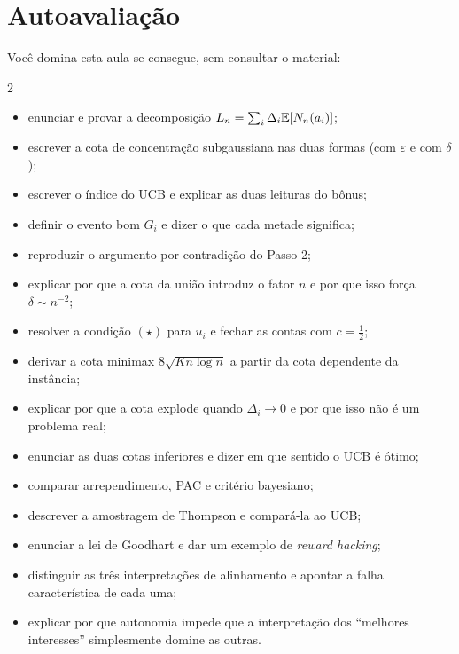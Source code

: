 \documentclass[11pt]{article}
\begin{document}
\section{Autoavaliação}

Você domina esta aula se consegue, sem consultar o material:

\begin{multicols}{2}
{\small
\begin{itemize}[leftmargin=1.5em, itemsep=0.3ex, topsep=0.2ex, label=$\square$]
  \item enunciar e provar a decomposição $L_n = \sum_i\Delta_i\mathbb{E}[N_n(a_i)]$;
  \item escrever a cota de concentração subgaussiana nas duas formas
        (com $\varepsilon$ e com $\delta$);
  \item escrever o índice do UCB e explicar as duas leituras do bônus;
  \item definir o evento bom $G_i$ e dizer o que cada metade significa;
  \item reproduzir o argumento por contradição do Passo 2;
  \item explicar por que a cota da união introduz o fator $n$ e por que isso
        força $\delta \sim n^{-2}$;
  \item resolver a condição $(\star)$ para $u_i$ e fechar as contas com
        $c = \tfrac12$;
  \item derivar a cota minimax $8\sqrt{Kn\log n}$ a partir da cota dependente
        da instância;
  \item explicar por que a cota explode quando $\Delta_i\to 0$ e por que isso
        não é um problema real;
  \item enunciar as duas cotas inferiores e dizer em que sentido o UCB é ótimo;
  \item comparar arrependimento, PAC e critério bayesiano;
  \item descrever a amostragem de Thompson e compará-la ao UCB;
  \item enunciar a lei de Goodhart e dar um exemplo de \emph{reward hacking};
  \item distinguir as três interpretações de alinhamento e apontar a falha
        característica de cada uma;
  \item explicar por que autonomia impede que a interpretação dos ``melhores
        interesses'' simplesmente domine as outras.
\end{itemize}}
\end{multicols}
\end{document}
